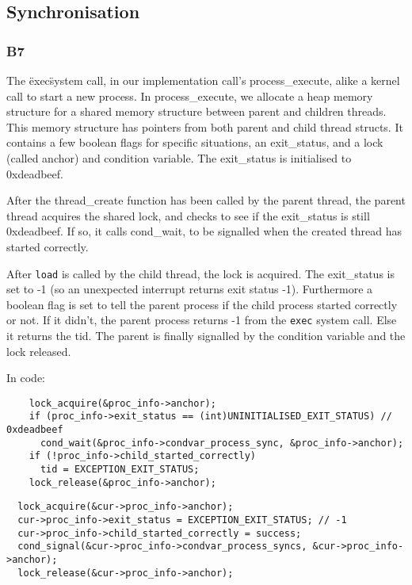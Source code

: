 \documentclass[a4wide, 11pt]{article}
\begin{document}
\subsection{Synchronisation}
\subsubsection{B7}

The \"exec\" system call, in our implementation call's process\_execute, alike a kernel call to start a new process. In process\_execute, we allocate a heap memory structure for a shared memory structure between parent and children threads. This memory structure has pointers from both parent and child thread structs. It contains a few boolean flags for specific situations, an exit\_status, and a lock (called anchor) and condition variable. The exit\_status is initialised to 0xdeadbeef.

After the thread\_create function has been called by the parent thread, the parent thread acquires the shared lock, and checks to see if the exit\_status is still 0xdeadbeef. If so, it calls cond\_wait, to be signalled when the created thread has started correctly.

After \texttt{load} is called by the child thread, the lock is acquired. The exit_status is set to -1 (so an unexpected interrupt returns exit status -1). Furthermore a boolean flag is set to tell the parent process if the child process started correctly or not. If it didn't, the parent process returns -1 from the \texttt{exec} system call. Else it returns the tid. The parent is finally signalled by the condition variable and the lock released.

In code:

\begin{verbatim}
    lock_acquire(&proc_info->anchor);
    if (proc_info->exit_status == (int)UNINITIALISED_EXIT_STATUS) // 0xdeadbeef
      cond_wait(&proc_info->condvar_process_sync, &proc_info->anchor);
    if (!proc_info->child_started_correctly)
      tid = EXCEPTION_EXIT_STATUS;
    lock_release(&proc_info->anchor);
\end{verbatim}

\begin{verbatim}
  lock_acquire(&cur->proc_info->anchor);
  cur->proc_info->exit_status = EXCEPTION_EXIT_STATUS; // -1
  cur->proc_info->child_started_correctly = success;
  cond_signal(&cur->proc_info->condvar_process_syncs, &cur->proc_info->anchor);
  lock_release(&cur->proc_info->anchor);
\end{verbatim}
\end{document}
